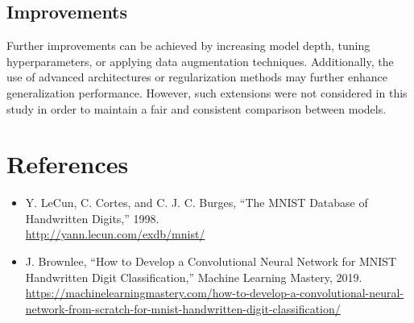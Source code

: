 \documentclass[11pt,a4paper]{article}
\begin{document}
	\subsection{Improvements}
	
	Further improvements can be achieved by increasing model depth, tuning hyperparameters, or applying data augmentation techniques. Additionally, the use of advanced architectures or regularization methods may further enhance generalization performance. However, such extensions were not considered in this study in order to maintain a fair and consistent comparison between models.
	
	\section{References}
	
	\begin{itemize}
		\item Y. LeCun, C. Cortes, and C. J. C. Burges, “The MNIST Database of Handwritten Digits,” 1998.\\
		\url{http://yann.lecun.com/exdb/mnist/}
		
		\item J. Brownlee, “How to Develop a Convolutional Neural Network for MNIST Handwritten Digit Classification,” Machine Learning Mastery, 2019.\\
		\url{https://machinelearningmastery.com/how-to-develop-a-convolutional-neural-network-from-scratch-for-mnist-handwritten-digit-classification/}
	\end{itemize}
	
\end{document}
